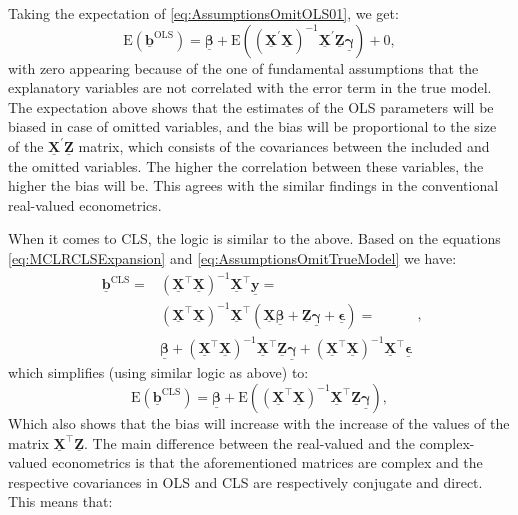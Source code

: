 \documentclass[
]{book}
\begin{document}
Taking the expectation of \eqref{eq:AssumptionsOmitOLS01}, we get:
\begin{equation}
    \mathrm{E}\left(\underline{\boldsymbol{b}}^{\text{OLS}}\right) = \underline{\boldsymbol{\beta}} + \mathrm{E}\left(\left( \underline{\mathbf{X}}^\prime \underline{\mathbf{X}} \right)^{-1} \underline{\mathbf{X}}^\prime \underline{\mathbf{Z}} \underline{\boldsymbol{\gamma}} \right) + 0 ,
    \label{eq:AssumptionsOmitOLS02}
\end{equation}
with zero appearing because of the one of fundamental assumptions that the explanatory variables are not correlated with the error term in the true model. The expectation above shows that the estimates of the OLS parameters will be biased in case of omitted variables, and the bias will be proportional to the size of the \(\underline{\mathbf{X}}^\prime \underline{\mathbf{Z}}\) matrix, which consists of the covariances between the included and the omitted variables. The higher the correlation between these variables, the higher the bias will be. This agrees with the similar findings in the conventional real-valued econometrics.

When it comes to CLS, the logic is similar to the above. Based on the equations \eqref{eq:MCLRCLSExpansion} and \eqref{eq:AssumptionsOmitTrueModel} we have:
\begin{equation}
    \begin{aligned}
    \underline{\boldsymbol{b}}^{\text{CLS}} =
    & \left( \underline{\mathbf{X}}^\top \underline{\mathbf{X}}\right)^{-1} \underline{\mathbf{X}}^\top \underline{\mathbf{y}} = \\
    & \left( \underline{\mathbf{X}}^\top \underline{\mathbf{X}}\right)^{-1} \underline{\mathbf{X}}^\top \left(\underline{\mathbf{X}} \underline{\boldsymbol{\beta}} + \underline{\mathbf{Z}} \underline{\boldsymbol{\gamma}} + \underline{\boldsymbol{\epsilon}}\right) = \\
    & \underline{\boldsymbol{\beta}} + \left( \underline{\mathbf{X}}^\top \underline{\mathbf{X}}\right)^{-1} \underline{\mathbf{X}}^\top \underline{\mathbf{Z}} \underline{\boldsymbol{\gamma}} + \left( \underline{\mathbf{X}}^\top \underline{\mathbf{X}}\right)^{-1} \underline{\mathbf{X}}^\top \underline{\boldsymbol{\epsilon}}
    \end{aligned} ,
    \label{eq:AssumptionsOmitCLS01}
\end{equation}
which simplifies (using similar logic as above) to:
\begin{equation}
    \mathrm{E}\left(\underline{\boldsymbol{b}}^{\text{CLS}}\right) = \underline{\boldsymbol{\beta}} + \mathrm{E}\left( \left( \underline{\mathbf{X}}^\top \underline{\mathbf{X}}\right)^{-1} \underline{\mathbf{X}}^\top \underline{\mathbf{Z}} \underline{\boldsymbol{\gamma}}\right) ,
    \label{eq:AssumptionsOmitCLS02}
\end{equation}
Which also shows that the bias will increase with the increase of the values of the matrix \(\underline{\mathbf{X}}^\top \underline{\mathbf{Z}}\). The main difference between the real-valued and the complex-valued econometrics is that the aforementioned matrices are complex and the respective covariances in OLS and CLS are respectively conjugate and direct. This means that:
\end{document}
